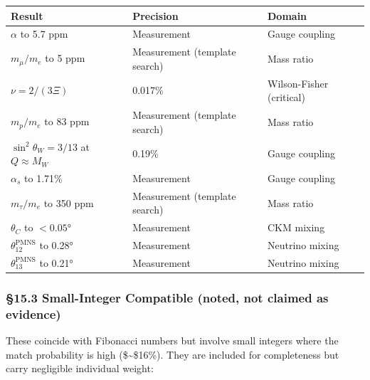 \documentclass[
  11pt,
  a4paper]{article}
\begin{document}
\begin{longtable}[]{@{}lll@{}}
\toprule\noalign{}
Result & Precision & Domain \\
\midrule\noalign{}
\endhead
\bottomrule\noalign{}
\endlastfoot
\(\alpha\) to 5.7 ppm & Measurement & Gauge coupling \\
\(m_\mu/m_e\) to 5 ppm & Measurement (template search) & Mass ratio \\
\(\nu = 2/(3\Xi)\) & 0.017\% & Wilson-Fisher (critical) \\
\(m_p/m_e\) to 83 ppm & Measurement (template search) & Mass ratio \\
\(\sin^2\theta_W = 3/13\) at \(Q \approx M_W\) & 0.19\% & Gauge
coupling \\
\(\alpha_s\) to 1.71\% & Measurement & Gauge coupling \\
\(m_\tau/m_e\) to 350 ppm & Measurement (template search) & Mass
ratio \\
\(\theta_C\) to \(< 0.05°\) & Measurement & CKM mixing \\
\(\theta_{12}^{\text{PMNS}}\) to 0.28° & Measurement & Neutrino
mixing \\
\(\theta_{13}^{\text{PMNS}}\) to 0.21° & Measurement & Neutrino
mixing \\
\end{longtable}

\subsubsection{§15.3 Small-Integer Compatible (noted, not claimed as
evidence)}\label{small-integer-compatible-noted-not-claimed-as-evidence}

These coincide with Fibonacci numbers but involve small integers where
the match probability is high (\$\sim\$16\%). They are included for
completeness but carry negligible individual weight:
\end{document}
